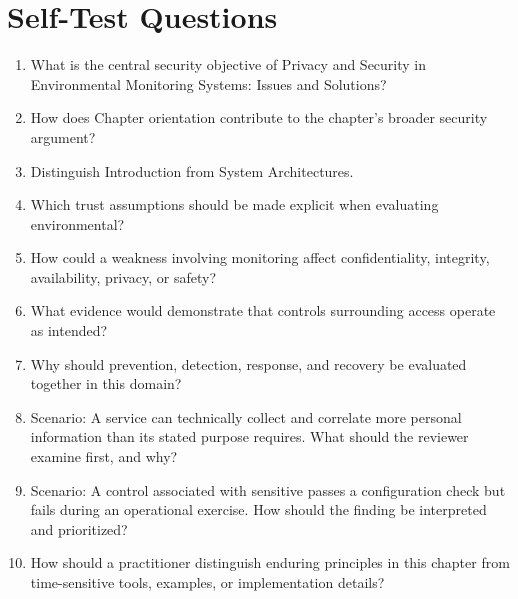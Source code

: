 \documentclass[11pt]{article}
\begin{document}
\section*{Self-Test Questions}
\begin{enumerate}
\item What is the central security objective of Privacy and Security in Environmental Monitoring Systems: Issues and Solutions?
\item How does Chapter orientation contribute to the chapter's broader security argument?
\item Distinguish Introduction from System Architectures.
\item Which trust assumptions should be made explicit when evaluating environmental?
\item How could a weakness involving monitoring affect confidentiality, integrity, availability, privacy, or safety?
\item What evidence would demonstrate that controls surrounding access operate as intended?
\item Why should prevention, detection, response, and recovery be evaluated together in this domain?
\item Scenario: A service can technically collect and correlate more personal information than its stated purpose requires. What should the reviewer examine first, and why?
\item Scenario: A control associated with sensitive passes a configuration check but fails during an operational exercise. How should the finding be interpreted and prioritized?
\item How should a practitioner distinguish enduring principles in this chapter from time-sensitive tools, examples, or implementation details?
\end{enumerate}
\end{document}

